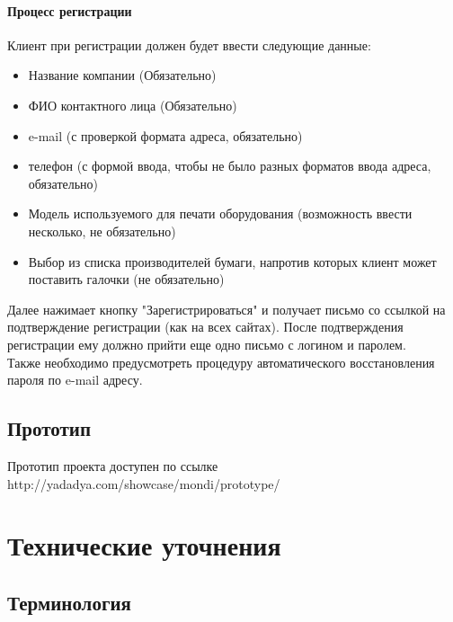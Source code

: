 \documentclass[DIV=calc, paper=a4, fontsize=11pt]{scrartcl} %
\begin{document}
\paragraph{Процесс регистрации}
Клиент при регистрации должен будет ввести следующие данные:

\begin{itemize}
	\item Название компании (Обязательно)
	\item ФИО контактного лица (Обязательно)
	\item e-mail (с проверкой формата адреса, обязательно)
	\item телефон (с формой ввода, чтобы не было разных форматов ввода адреса, обязательно)
	\item Модель используемого для печати оборудования (возможность ввести несколько, не обязательно)
	\item Выбор из списка производителей бумаги, напротив которых клиент может поставить галочки (не обязательно)
\end{itemize}

Далее нажимает кнопку "Зарегистрироваться" и получает письмо со ссылкой на подтверждение регистрации (как на всех сайтах). После подтверждения регистрации ему должно прийти еще одно письмо с логином и паролем. 
\\[0.5cm] 
Также необходимо предусмотреть процедуру автоматического восстановления пароля по e-mail адресу.

\subsection{Прототип}
Прототип проекта доступен по ссылке http://yadadya.com/showcase/mondi/prototype/

\section{Технические уточнения}

\subsection{Терминология}
        
\end{document}

